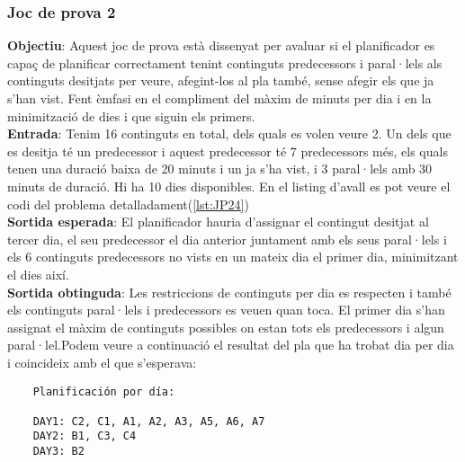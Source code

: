 \documentclass[a4paper]{article}
\begin{document}
	\subsubsection{Joc de prova 2}
	\textbf{Objectiu}: Aquest joc de prova està dissenyat per avaluar si el planificador es capaç de planificar correctament tenint continguts predecessors i paral·lels als continguts desitjats per veure, afegint-los al pla també, sense afegir els que ja s'han vist. Fent èmfasi en el compliment del màxim de minuts per dia i en la minimització de dies i que siguin els primers. \\
	\textbf{Entrada}: Tenim 16 continguts en total, dels quals es volen veure 2. Un dels que es desitja té un predecessor i aquest predecessor té 7 predecessors més, els quals tenen una duració baixa de 20 minuts i un ja s'ha vist, i 3 paral·lels amb 30 minuts de duració. Hi ha 10 dies disponibles. En el listing d'avall es pot veure el codi del problema detalladament(\ref{lst:JP24})\\
	\textbf{Sortida esperada}: El planificador hauria d'assignar el contingut desitjat al tercer dia, el seu predecessor el dia anterior juntament amb els seus paral·lels i els 6 continguts predecessors no vists en un mateix dia el primer dia, minimitzant el dies així.\\
	\textbf{Sortida obtinguda}: Les restriccions de continguts per dia es respecten i també els continguts paral·lels i predecessors es veuen quan toca. El primer dia s'han assignat el màxim de continguts possibles on estan tots els predecessors i algun paral·lel.Podem veure a continuació el resultat del pla que ha trobat dia per dia i coincideix amb el que s'esperava:
	
	\begin{verbatim}
	Planificación por día:
	
	DAY1: C2, C1, A1, A2, A3, A5, A6, A7
	DAY2: B1, C3, C4
	DAY3: B2
		
	\end{verbatim}
	
		
	
\end{document}
